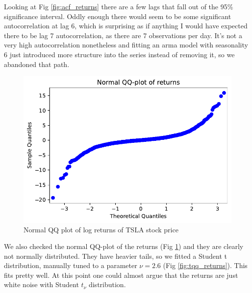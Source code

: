 Looking at Fig \ref{fig:acf_returns} there are a few lags that fall out of the 95\% significance interval. Oddly enough there would seem to be some significant autocorrelation at lag 6, which is surprising as if anything I would have expected there to be lag 7 autocorrelation, as there are 7 observations per day. It's not a very high autocorrelation nonetheless and fitting an \acrshort{arma} model with seasonality 6 just introduced more structure into the series instead of removing it, so we abandoned that path.

\begin{figure}
	\centering
	\includegraphics[width=\textwidth]{img/img_nqq_returns.pdf}
	\caption{Normal QQ plot of log returns of TSLA stock price}
	\label{fig:nqq_returns}
\end{figure}

We also checked the normal QQ-plot of the returns (Fig \ref{fig:nqq_returns}) and they are clearly not normally distributed. They have heavier tails, so we fitted a Student t distribution, manually tuned to a parameter $\nu = 2.6$ (Fig \ref{fig:tqq_returns}). This fits pretty well. At this point one could almost argue that the returns are just white noise with Student $t_{\nu}$ distribution.

